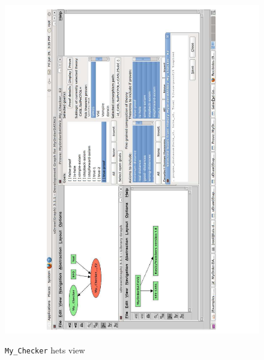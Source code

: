 \begin{figure}
	\centering
	\scriptsize
	\begin{minipage}{.5\textwidth}
		\includegraphics[scale=0.35, angle=-90]{figure-chapterIV/fig4-39}\\
		\caption{\texttt{My\_Checker} \gls{hets} view}
		\label{figure4-39}
	\end{minipage}%
	\begin{minipage}{.5\textwidth}

\end{minipage}
\end{figure}
